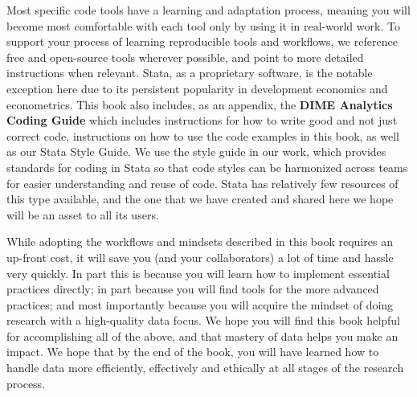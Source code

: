 Most specific code tools have a learning and adaptation process,
meaning you will become most comfortable with each tool
only by using it in real-world work.
To support your process of learning reproducible tools and workflows,
we reference free and open-source tools wherever possible,
and point to more detailed instructions when relevant.
Stata, as a proprietary software, is the notable exception here
due to its persistent popularity in development economics and econometrics.
This book also includes, as an appendix,
the \textbf{DIME Analytics Coding Guide} 
which includes instructions for how to write good and not just correct code,
instructions on how to use the code examples in this book,
as well as our Stata Style Guide.
We use the style guide in our work, which provides
standards for coding in Stata so that code styles
can be harmonized across teams for easier understanding and reuse of code.
Stata has relatively few resources of this type available,
and the one that we have created and shared here
we hope will be an asset to all its users.

While adopting the workflows and mindsets described in this book requires an up-front cost,
it will save you (and your collaborators) a lot of time and hassle very quickly.
In part this is because you will learn how to implement essential practices directly;
in part because you will find tools for the more advanced practices;
and most importantly because you will acquire the mindset of doing research with a high-quality data focus.
We hope you will find this book helpful for accomplishing all of the above,
and that mastery of data helps you make an impact.
We hope that by the end of the book,
you will have learned how to handle data more efficiently, effectively and ethically
at all stages of the research process.

\mainmatter
